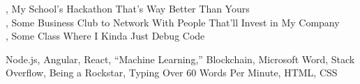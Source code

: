 \documentclass[10pt]{akshay-resume}
\begin{document}
\begin{minipage}[t]{0.34\linewidth}


, My School's Hackathon That's Way Better Than Yours
\\\vspace{0.5em}
, Some Business Club to Network With People That'll Invest in My Company
\\\vspace{0.5em}
, Some Class Where I Kinda Just Debug Code




Node.js, Angular, React, ``Machine Learning,'' Blockchain, Microsoft Word, Stack Overflow, Being a Rockstar, Typing Over 60 Words Per Minute, HTML, CSS

%
%

\end{minipage} 
\hfill
\end{document}
